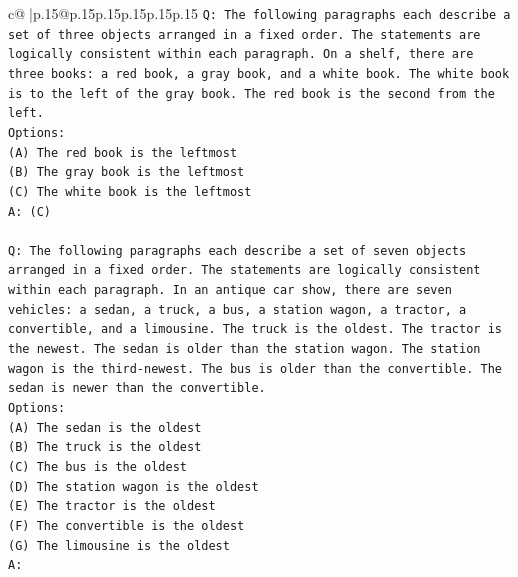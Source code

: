 \documentclass{article}
\begin{document}
{\begin{supertabular}{c@{$\;$}|p{.15\linewidth}@{}p{.15\linewidth}p{.15\linewidth}p{.15\linewidth}p{.15\linewidth}p{.15\linewidth}}
{{{\texttt{Q: The following paragraphs each describe a set of three objects arranged in a fixed order. The statements are logically consistent within each paragraph. On a shelf, there are three books: a red book, a gray book, and a white book. The white book is to the left of the gray book. The red book is the second from the left.} \\
\texttt{Options:} \\
\texttt{(A) The red book is the leftmost} \\
\texttt{(B) The gray book is the leftmost} \\
\texttt{(C) The white book is the leftmost} \\
\texttt{A: (C)} \\
\\ 
\texttt{Q: The following paragraphs each describe a set of seven objects arranged in a fixed order. The statements are logically consistent within each paragraph. In an antique car show, there are seven vehicles: a sedan, a truck, a bus, a station wagon, a tractor, a convertible, and a limousine. The truck is the oldest. The tractor is the newest. The sedan is older than the station wagon. The station wagon is the third{-}newest. The bus is older than the convertible. The sedan is newer than the convertible.} \\
\texttt{Options:} \\
\texttt{(A) The sedan is the oldest} \\
\texttt{(B) The truck is the oldest} \\
\texttt{(C) The bus is the oldest} \\
\texttt{(D) The station wagon is the oldest} \\
\texttt{(E) The tractor is the oldest} \\
\texttt{(F) The convertible is the oldest} \\
\texttt{(G) The limousine is the oldest} \\
\texttt{A:} \\
            }
        }
    }
     \\ \\


\end{supertabular}}
\end{document}
